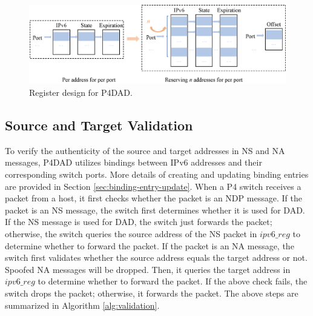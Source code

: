 \documentclass[journal]{IEEEtran}
\begin{document}
        \begin{figure}
        \centerline{
            \includegraphics[scale=0.65]{figure/Register.eps}
        }
        \caption{Register design for P4DAD.}
        \label{fig:register}
        \end{figure}


    \subsection{Source and Target Validation}\label{sec:source and target validation}
        To verify the authenticity of the source and target addresses in NS and NA messages, P4DAD utilizes bindings between IPv6 addresses and their corresponding switch ports. More details of creating and updating binding entries are provided in Section \ref{sec:binding-entry-update}. When a P4 switch receives a packet from a host, it first checks whether the packet is an NDP message. If the packet is an NS message, the switch first determines whether it is used for DAD. If the NS message is used for DAD, the switch just forwards the packet; otherwise, the switch queries the source address of the NS packet in $ipv6\_reg$ to determine whether to forward the packet.
        If the packet is an NA message, the switch first validates whether the source address equals the target address or not. Spoofed NA messages will be dropped. Then, it queries the target address in $ipv6\_reg$ to determine whether to forward the packet. If the above check fails, the switch drops the packet; otherwise, it forwards the packet.
        The above steps are summarized in Algorithm \ref{alg:validation}.
\end{document}
